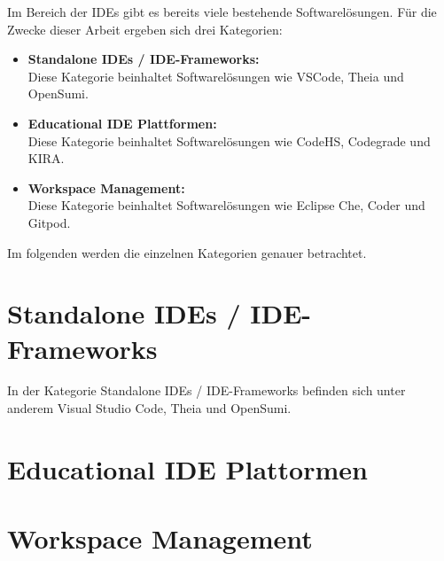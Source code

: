 Im Bereich der IDEs gibt es bereits viele bestehende Softwarelösungen. Für die Zwecke dieser Arbeit ergeben sich drei Kategorien:

\begin{itemize}
    \item \textbf{Standalone IDEs / IDE-Frameworks:} \\ Diese Kategorie beinhaltet Softwarelösungen wie VSCode, Theia und OpenSumi.
    \item \textbf{Educational IDE Plattformen:} \\ Diese Kategorie beinhaltet Softwarelösungen wie CodeHS, Codegrade und KIRA.
    \item \textbf{Workspace Management:} \\ Diese Kategorie beinhaltet Softwarelösungen wie Eclipse Che, Coder und Gitpod.
\end{itemize}

Im folgenden werden die einzelnen Kategorien genauer betrachtet.

\section{Standalone IDEs / IDE-Frameworks}
In der Kategorie Standalone IDEs / IDE-Frameworks befinden sich unter anderem Visual Studio Code, Theia und OpenSumi.

\section{Educational IDE Plattormen}


\section{Workspace Management}